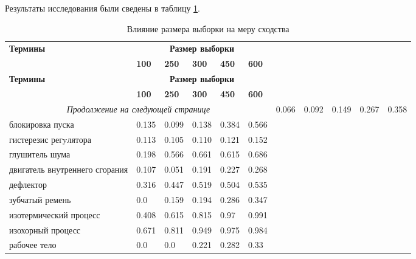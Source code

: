 Результаты исследования были сведены в таблицу \ref{table_research}.

\begin{longtable}{|p{5cm}|p{1.5cm}|p{1.5cm}|p{1.5cm}|p{1.5cm}|p{1.5cm}|}
	\caption{Влияние размера выборки на меру сходства}\label{table_research}\\
	\hline
	
	\textbf{Термины} & \multicolumn{5}{|c|}{\textbf{Размер выборки}}\\ 
	\cline{2-6}
	& \textbf{100} & \textbf{250} & \textbf{300} & \textbf{450} & \textbf{600} \\
	\hline
	\endfirsthead
	
	\hline
	\textbf{Термины} & \multicolumn{5}{|c|}{\textbf{Размер выборки}}\\ 
	\cline{2-6}
	& \textbf{100} & \textbf{250} & \textbf{300} & \textbf{450} & \textbf{600} \\
	\hline
	\endhead
	
	\hline
	\multicolumn{6}{c}{\textit{Продолжение на следующей странице}}
	\endfoot
	\hline
	\endlastfoot
	
	аккумуляторный элемент & 0.066 & 0.092 & 0.149 & 0.267 & 0.358\\
	\hline
	блокировка пуска & 0.135 & 0.099 & 0.138 & 0.384 & 0.566\\
	\hline
	гистерезис регyлятора & 0.113 & 0.105 & 0.110 & 0.121 & 0.152 \\
	\hline
	глушитель шума & 0.198 & 0.566 & 0.661 & 0.615 & 0.686\\ 
	\hline
	двигатель внутреннего сгорания & 0.107 & 0.051 & 0.191 & 0.227 & 0.268 \\ 
	\hline
	дефлектор & 0.316 & 0.447 & 0.519 & 0.504 & 0.535\\ 
	\hline
	зубчатый ремень & 0.0 & 0.159 & 0.194 & 0.286 & 0.347\\ 
	\hline
	изотермический процесс & 0.408 & 0.615 & 0.815 & 0.97 & 0.991\\
	\hline
	изохорный процесс & 0.671 & 0.811 & 0.949 & 0.975 & 0.984\\
	\hline
	рабочее тело & 0.0 & 0.0 & 0.221 & 0.282 & 0.33 
\end{longtable}

